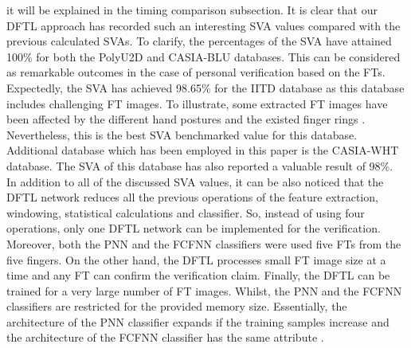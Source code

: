 \documentclass[conference]{IEEEtran}
\begin{document}
it will be explained in the timing comparison subsection. It is clear that our DFTL approach has recorded such an interesting SVA values compared with the previous calculated SVAs. To clarify, the percentages of the SVA have attained 100\% for both the PolyU2D and CASIA-BLU databases. This can be considered as remarkable outcomes in the case of personal verification based on the FTs. Expectedly, the SVA has achieved 98.65\% for the IITD database as this database includes challenging FT images. To illustrate, some extracted FT images have been affected by the different hand postures and the existed finger rings \cite{Al-Nima2017efficient}. Nevertheless, this is the best SVA benchmarked value for this database. Additional database which has been employed in this paper is the CASIA-WHT database. The SVA of this database has also reported a valuable result of 98\%. \\
In addition to all of the discussed SVA values, it can be also noticed that the DFTL network reduces all the previous operations of the feature extraction, windowing, statistical calculations and classifier. So, instead of using four operations, only one DFTL network can be implemented for the verification. Moreover, both the PNN and the FCFNN classifiers were used five FTs from the five fingers. On the other hand, the DFTL processes small FT image size at a time and any FT can confirm the verification claim. Finally, the DFTL can be trained for a very large number of FT images. Whilst, the PNN and the FCFNN classifiers are restricted for the provided memory size. Essentially, the architecture of the PNN classifier expands if the training samples increase \cite{shorrock2000biometric} and the architecture of the FCFNN classifier has the same attribute \cite{Al-Nima2017finger}.
\end{document}
